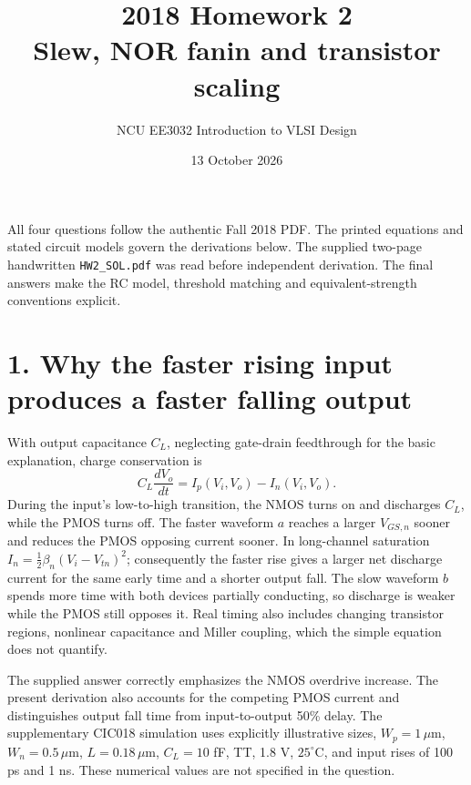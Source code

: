\documentclass[11pt,a4paper]{article}
\title{2018 Homework 2\\Slew, NOR fanin and transistor scaling}
\author{NCU EE3032 Introduction to VLSI Design}\date{13 October 2026}
\newcommand{\VDD}{V_{\mathrm{DD}}}
\begin{document}
\maketitle
All four questions follow the authentic Fall 2018 PDF. The printed equations
and stated circuit models govern the derivations below. The supplied
two-page handwritten \texttt{HW2\_SOL.pdf} was read before independent
derivation. The final answers make the RC model, threshold matching and
equivalent-strength conventions explicit.

\section*{1. Why the faster rising input produces a faster falling output}
With output capacitance $C_L$, neglecting gate-drain feedthrough for the
basic explanation, charge conservation is
\[
 C_L\frac{dV_o}{dt}=I_p(V_i,V_o)-I_n(V_i,V_o).
\]
During the input's low-to-high transition, the NMOS turns on and discharges
$C_L$, while the PMOS turns off. The faster waveform $a$ reaches a larger
$V_{GS,n}$ sooner and reduces the PMOS opposing current sooner.
In long-channel saturation $I_n=\frac12\beta_n(V_i-V_{tn})^2$; consequently
the faster rise gives a larger net discharge current for the same early time
and a shorter output fall. The slow waveform $b$ spends more time with both
devices partially conducting, so discharge is weaker while the PMOS still
opposes it. Real timing also includes changing transistor regions, nonlinear
capacitance and Miller coupling, which the simple equation does not quantify.

\begin{center}\end{center}
The supplied answer correctly emphasizes the NMOS overdrive increase.
The present derivation also accounts for the competing PMOS current and
distinguishes output fall time from input-to-output 50\% delay.
The supplementary CIC018 simulation uses explicitly illustrative sizes,
$W_p=1\,\mu$m, $W_n=0.5\,\mu$m, $L=0.18\,\mu$m, $C_L=10$ fF,
TT, 1.8 V, $25^\circ$C, and input rises of 100 ps and 1 ns.
These numerical values are not specified in the question.
\end{document}
